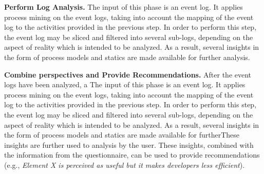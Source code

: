 \begin{inparadesc}
	\item[\bfseries Perform Log Analysis.] The input of this phase is an event log. It applies process mining on the event logs, taking into account the mapping of the event log to the activities provided in the previous step. In order to perform this step, the event log may be sliced and filtered into several sub-logs, depending on the aspect of reality which is intended to be analyzed. As a result, several insights in the form of process models and statics are made available for further analysis. \\
	
	\item[\bfseries Combine perspectives and Provide Recommendations.] After the event logs have been analyzed, a 
	 The input of this phase is an event log. It applies process mining on the event logs, taking into account the mapping of the event log to the activities provided in the previous step. In order to perform this step, the event log may be sliced and filtered into several sub-logs, depending on the aspect of reality which is intended to be analyzed. As a result, several insights in the form of process models and statics are made available for furtherThese insights are further used to analysis by the user. These insights, combined with the information from the questionnaire, can be used to provide recommendations (e.g., \emph{Element X is perceived as useful but it makes developers less efficient}).
	
\end{inparadesc}



